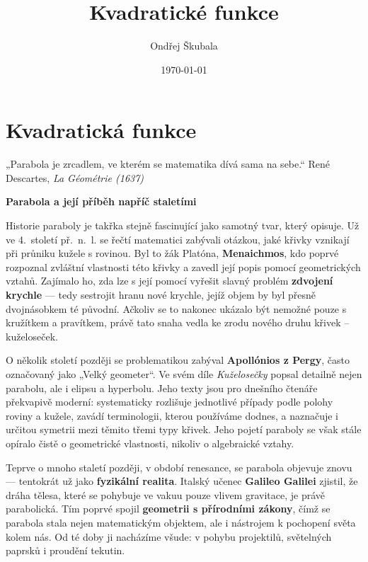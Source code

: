 \documentclass[12pt,a4paper]{article}
\title{Kvadratické funkce}
\author{Ondřej Škubala}
\date{\today}
\begin{document}
\maketitle
\newpage

\section{Kvadratická funkce}

\begin{quotebox}
{„Parabola je zrcadlem, ve kterém se matematika dívá sama na sebe.“}
{René Descartes, \textit{La Géométrie (1637)}}
\end{quotebox}

\begin{historicalbox}
\textbf{Parabola a její příběh napříč staletími}

Historie paraboly je takřka stejně fascinující jako samotný tvar, který opisuje.  
Už ve 4.~století př.~n.~l. se řečtí matematici zabývali otázkou, jaké křivky vznikají při průniku kužele s rovinou.  
Byl to žák Platóna, \textbf{Menaichmos}, kdo poprvé rozpoznal zvláštní vlastnosti této křivky a zavedl její popis pomocí geometrických vztahů.  
Zajímalo ho, zda lze s její pomocí vyřešit slavný problém \textbf{zdvojení krychle} — tedy sestrojit hranu nové krychle, jejíž objem by byl přesně dvojnásobkem té původní.  
Ačkoliv se to nakonec ukázalo být nemožné pouze s kružítkem a pravítkem, právě tato snaha vedla ke zrodu nového druhu křivek – kuželoseček.

O několik století později se problematikou zabýval \textbf{Apollónios z Pergy}, často označovaný jako „Velký geometer“.  
Ve svém díle \textit{Kuželosečky} popsal detailně nejen parabolu, ale i elipsu a hyperbolu.  
Jeho texty jsou pro dnešního čtenáře překvapivě moderní: systematicky rozlišuje jednotlivé případy podle polohy roviny a kužele, zavádí terminologii, kterou používáme dodnes, a naznačuje i určitou symetrii mezi těmito třemi typy křivek.  
Jeho pojetí paraboly se však stále opíralo čistě o geometrické vlastnosti, nikoliv o algebraické vztahy.

\smallskip
Teprve o mnoho staletí později, v období renesance, se parabola objevuje znovu — tentokrát už jako \textbf{fyzikální realita}.  
Italský učenec \textbf{Galileo Galilei} zjistil, že dráha tělesa, které se pohybuje ve vakuu pouze vlivem gravitace, je právě parabolická.  
Tím poprvé spojil \textbf{geometrii s přírodními zákony}, čímž se parabola stala nejen matematickým objektem, ale i nástrojem k pochopení světa kolem nás.  
Od té doby ji nacházíme všude: v pohybu projektilů, světelných paprsků i proudění tekutin.


\end{historicalbox}
\end{document}
